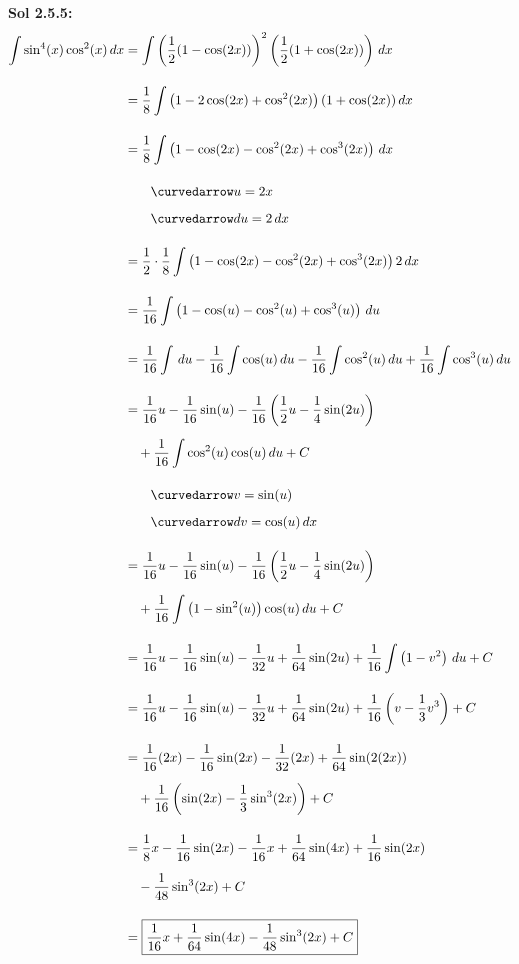 \begin{tcolorbox}[solution]
    \textbf{Sol 2.5.5: } \begin{align*}
        \int \sin^4 (x)\cos^2 (x) \, dx &= \int \left(\dfrac{1}{2}(1 - \cos (2x))\right)^2\left(\dfrac{1}{2}(1 + \cos (2x))\right) \, dx \\[11pt]
        & = \dfrac{1}{8} \int \left(1 - 2\cos (2x) + \cos^2 (2x)\right)(1 + \cos (2x)) \, dx \\[11pt]
        & = \dfrac{1}{8} \int \left(1 - \cos (2x) - \cos^2 (2x) + \cos^3 (2x)\right) \, dx \\[11pt]
        & \qquad \curvedarrow u = 2x \\[5.5pt]
        & \qquad \curvedarrow du = 2 \, dx \\[11pt]
        & = \dfrac{1}{2} \cdot \dfrac{1}{8} \int \left(1 - \cos (2x) - \cos^2 (2x) + \cos^3 (2x)\right) 2 \, dx \\[11pt]
        & = \dfrac{1}{16} \int \left(1 - \cos (u) - \cos^2 (u) + \cos^3 (u)\right) \, du \\[11pt]
        & = \dfrac{1}{16}\int \, du - \dfrac{1}{16}\int \cos (u) \, du - \dfrac{1}{16}\int \cos^2 (u) \, du + \dfrac{1}{16}\int \cos^3 (u) \, du \\[11pt]
        & = \dfrac{1}{16}u - \dfrac{1}{16}\sin (u) - \dfrac{1}{16}\left(\dfrac{1}{2}u - \dfrac{1}{4}\sin (2u)\right) \\[5.5pt]
        & \quad + \dfrac{1}{16}\int \cos^2 (u)\cos (u) \, du + C \\[11pt]
        & \qquad \curvedarrow v = \sin (u) \\[5.5pt]
        & \qquad \curvedarrow dv = \cos (u) \, dx \\[11pt]
        & = \dfrac{1}{16}u - \dfrac{1}{16}\sin (u) - \dfrac{1}{16}\left(\dfrac{1}{2}u - \dfrac{1}{4}\sin (2u)\right) \\[5.5pt]
        & \quad + \dfrac{1}{16}\int \left(1 - \sin^2 (u)\right)\cos (u) \, du + C \\[11pt]
        & = \dfrac{1}{16}u - \dfrac{1}{16}\sin (u) - \dfrac{1}{32}u + \dfrac{1}{64}\sin (2u) + \dfrac{1}{16}\int \left(1 - v^2\right) \, du + C \\[11pt]
        & = \dfrac{1}{16}u - \dfrac{1}{16}\sin (u) - \dfrac{1}{32}u + \dfrac{1}{64}\sin (2u) + \dfrac{1}{16}\left(v - \dfrac{1}{3}v^3\right) + C \\[11pt]
        & = \dfrac{1}{16}(2x) - \dfrac{1}{16}\sin (2x) - \dfrac{1}{32}(2x) + \dfrac{1}{64}\sin (2(2x)) \\[5.5pt]
        & \quad + \dfrac{1}{16}\left(\sin(2x) - \dfrac{1}{3}\sin^3 (2x)\right) + C \\[11pt]
        & = \dfrac{1}{8}x - \dfrac{1}{16}\sin (2x) - \dfrac{1}{16}x + \dfrac{1}{64}\sin (4x) + \dfrac{1}{16}\sin (2x) \\[5.5pt]
        & \quad - \dfrac{1}{48}\sin^3 (2x) + C \\[11pt]
        & = \boxed{\dfrac{1}{16}x + \dfrac{1}{64}\sin (4x) - \dfrac{1}{48}\sin^3 (2x) + C}
    \end{align*}
\end{tcolorbox}

